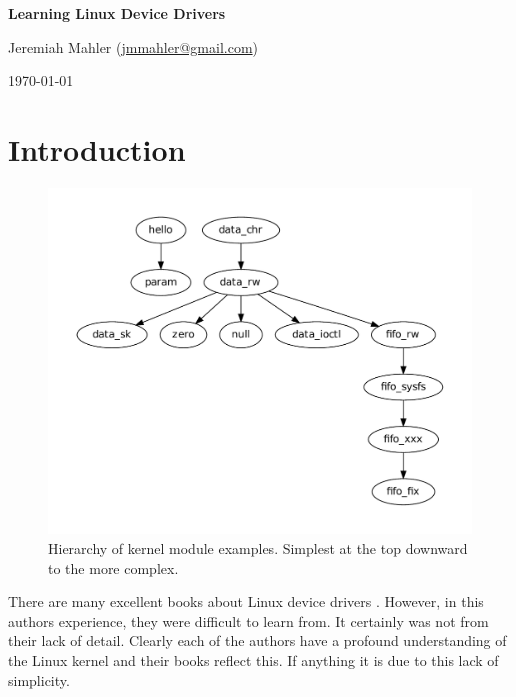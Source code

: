 \documentclass{article}
\begin{document}
\VerbatimFootnotes


\thispagestyle{empty}

\centerline{\Large \textbf{Learning Linux Device Drivers}}
\vspace{0.1in}
\centerline{\normalsize {Jeremiah Mahler} ({\href{mailto:jmmahler@gmail.com}{jmmahler@gmail.com}})}
\centerline{\small \today}
\vspace{0.2in}


\tableofcontents
\pagebreak

\section{Introduction}

\begin{figure}[h!]
\begin{center}
\includegraphics[scale=0.6]{hierarchy/hier}
\end{center}
\caption{Hierarchy of kernel module examples.  Simplest at the
top downward to the more complex.}\label{fig:hier}
\end{figure}

There are many excellent books about Linux device drivers
\autocite{corbet2009linux}
\autocite{venkateswaran2008essential}
\autocite{love2010linux}
\autocite{love2013linux}.
However, in this authors experience, they were difficult to learn from.
It certainly was not from their lack of detail.
Clearly each of the authors have a profound understanding of the Linux
kernel and their books reflect this.
If anything it is due to this lack of simplicity.
\end{document}
